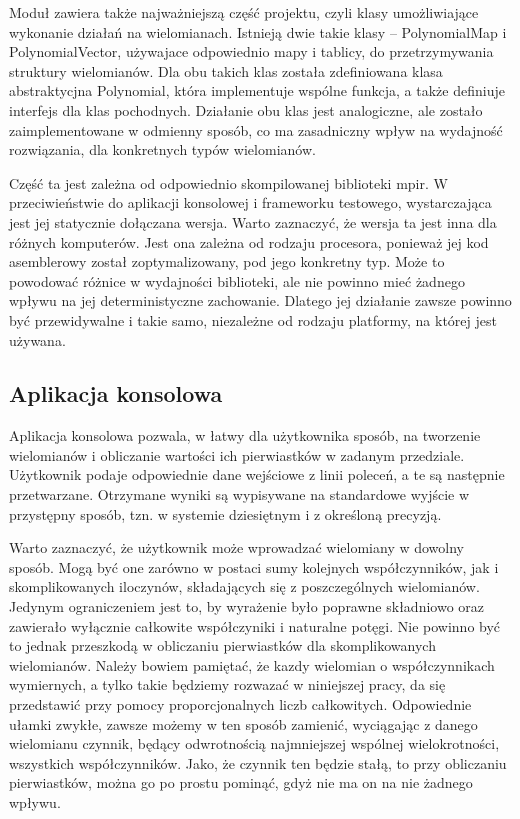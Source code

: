 \documentclass[twoside,a4paper]{book}
\begin{document}
Moduł zawiera także najważniejszą część projektu, czyli klasy umożliwiające wykonanie działań na wielomianach. Istnieją dwie takie klasy -- PolynomialMap i PolynomialVector, używajace odpowiednio mapy i tablicy, do przetrzymywania struktury wielomianów. Dla obu takich klas została zdefiniowana klasa abstraktycjna Polynomial, która implementuje wspólne funkcja, a także definiuje interfejs dla klas pochodnych. Działanie obu klas jest analogiczne, ale zostało zaimplementowane w odmienny sposób, co ma zasadniczny wpływ na wydajność rozwiązania, dla konkretnych typów wielomianów.

Część ta jest zależna od odpowiednio skompilowanej biblioteki mpir. W przeciwieństwie do aplikacji konsolowej i frameworku testowego, wystarczająca jest jej statycznie dołączana wersja. Warto zaznaczyć, że wersja ta jest inna dla różnych komputerów. Jest ona zależna od rodzaju procesora, ponieważ jej kod asemblerowy został zoptymalizowany, pod jego konkretny typ. Może to powodować różnice w wydajności biblioteki, ale nie powinno mieć żadnego wpływu na jej deterministyczne zachowanie. Dlatego jej działanie zawsze powinno być przewidywalne i takie samo, niezależne od rodzaju platformy, na której jest używana.

\subsection{Aplikacja konsolowa}

Aplikacja konsolowa pozwala, w łatwy dla użytkownika sposób, na tworzenie wielomianów i obliczanie wartości ich pierwiastków w zadanym przedziale. Użytkownik podaje odpowiednie dane wejściowe z linii poleceń, a te są następnie przetwarzane. Otrzymane wyniki są wypisywane na standardowe wyjście w przystępny sposób, tzn. w systemie dziesiętnym i z określoną precyzją.

Warto zaznaczyć, że użytkownik może wprowadzać wielomiany w dowolny sposób. Mogą być one zarówno w postaci sumy kolejnych współczynników, jak i skomplikowanych iloczynów, składających się z poszczególnych wielomianów. Jedynym ograniczeniem jest to, by wyrażenie było poprawne składniowo oraz zawierało wyłącznie całkowite współczyniki i naturalne potęgi. Nie powinno być to jednak przeszkodą w obliczaniu pierwiastków dla skomplikowanych wielomianów. Należy bowiem pamiętać, że kazdy wielomian o współczynnikach wymiernych, a tylko takie będziemy rozwazać w niniejszej pracy, da się przedstawić przy pomocy proporcjonalnych liczb całkowitych. Odpowiednie ułamki zwykłe, zawsze możemy w ten sposób zamienić, wyciągając z danego wielomianu czynnik, będący odwrotnością najmniejszej wspólnej wielokrotności, wszystkich współczynników. Jako, że czynnik ten będzie stałą, to przy obliczaniu pierwiastków, można go po prostu pominąć, gdyż nie ma on na nie żadnego wpływu.
\end{document}
